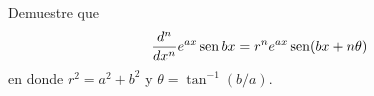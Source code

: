 \item Demuestre que
    \[ \frac{d^n}{dx^n} e^{ax} \operatorname{sen} bx = r^n e^{ax} \operatorname{sen}(bx + n\theta) \]
    en donde $r^2 = a^2 + b^2$ y $\theta = \tan^{-1}(b/a)$.
